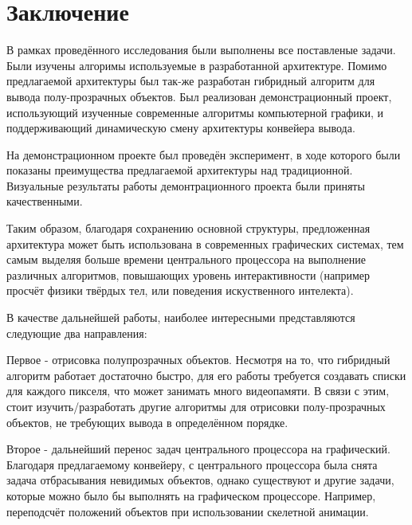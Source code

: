 \chapter*{Заключение} \label{ch-conclusion}
	В рамках проведённого исследования были выполнены все поставленые задачи. Были изучены алгоримы используемые в разработанной архитектуре. Помимо предлагаемой архитектуры был так-же разработан гибридный алгоритм для вывода полу-прозрачных объектов. Был реализован демонстрационный проект, использующий изученные современные алгоритмы компьютерной графики, и поддерживающий динамическую смену архитектуры конвейера вывода.
	
	На демонстрационном проекте был проведён эксперимент, в ходе которого были показаны преимущества предлагаемой архитектуры над традиционной. Визуальные результаты работы демонтрационного проекта были приняты качественными.
	
	Таким образом, благодаря сохранению основной структуры, предложенная архитектура может быть использована в современных графических системах, тем самым выделяя больше времени центрального процессора на выполнение различных алгоритмов, повышающих уровень интерактивности (например просчёт физики твёрдых тел, или поведения искуственного интелекта).
	
	В качестве дальнейшей работы, наиболее интересными представляются следующие два направления: 	
	
	Первое - отрисовка полупрозрачных объектов. Несмотря на то, что гибридный алгоритм работает достаточно быстро, для его работы требуется создавать списки для каждого пикселя, что может занимать много видеопамяти. В связи с этим, стоит изучить/разработать другие алгоритмы для отрисовки полу-прозрачных объектов, не требующих вывода в определённом порядке.

	Второе - дальнейший перенос задач центрального процессора на графический. Благодаря предлагаемому конвейеру, с центрального процессора была снята задача отбрасывания невидимых объектов, однако существуют и другие задачи, которые можно было бы выполнять на графическом процессоре. Например, переподсчёт положений объектов при использовании скелетной анимации.